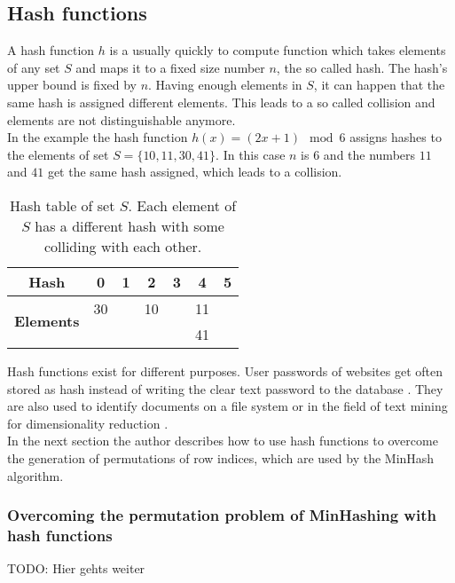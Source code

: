 \subsection{Hash functions}
A hash function $ h $ is a usually quickly to compute function which takes  elements of any set $ S $ and maps it to a fixed size number $ n $, the so called hash. The hash's upper bound is fixed by $ n $. Having enough elements in $ S $, it can happen that the same hash is assigned different elements. This leads to a so called collision and elements are not distinguishable anymore.\\

In the example the hash function $ h(x) = (2x+1) \mod 6 $ assigns hashes to the elements of set $ S = \{ 10,11,30,41 \} $.  In this case $ n $ is $ 6 $ and the numbers $ 11 $ and $ 41 $ get the same hash assigned, which leads to a collision.\\

\begin{table}[H]
    \centering
    \begin{tabular}{| c | c | c | c | c | c | c |}
        \hline
        \textbf{Hash} & \textbf{0} & \textbf{1} & \textbf{2} & \textbf{3} & \textbf{4} & \textbf{5}  \\
        \hline
        \multirow{2}{*}{\textbf{Elements}}   & 30 &    & 10 &    & 11 & \\
        &    &    &    &    & 41  &\\
        \hline
    \end{tabular}    
    \caption{Hash table of set $ S $. Each element of $ S $ has a different  hash with some colliding with each other.}
\end{table}

Hash functions exist for different purposes. User passwords of websites get often stored as hash instead of writing the clear text password to the database \cite{cryptographicHashFunctions}. They are also used to identify documents on a file system or in the field of text mining for dimensionality reduction \cite{practicalHashFunctions}.\\

In the next section the author describes how to use hash functions to overcome the generation of permutations of row indices, which are used by the MinHash algorithm.\\

\subsubsection{Overcoming the permutation problem of MinHashing with hash functions}

TODO: Hier gehts weiter